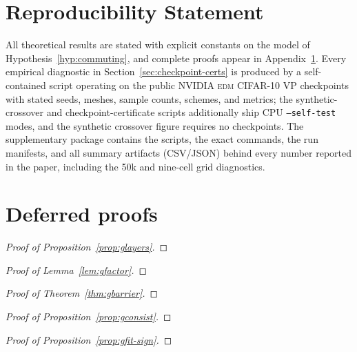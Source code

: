 \documentclass{article} %
\theoremstyle{plain}
\theoremstyle{definition}
\theoremstyle{remark}
\newif\ifarxiv
\begin{document}
\section*{Reproducibility Statement}
All theoretical results are stated with explicit constants on the model of
Hypothesis~\ref{hyp:commuting}, and complete proofs appear in
Appendix~\ref{app:proofs}.  Every empirical diagnostic in
Section~\ref{sec:checkpoint-certs} is produced by a self-contained script
operating on the public NVIDIA \textsc{edm} CIFAR-10 VP checkpoints with
stated seeds, meshes, sample counts, schemes, and metrics; the
synthetic-crossover and checkpoint-certificate scripts additionally ship CPU
\texttt{--self-test} modes, and the synthetic crossover figure requires no
checkpoints.  The supplementary package contains the scripts, the exact
commands, the run manifests, and all summary artifacts (CSV/JSON) behind every
number reported in the paper, including the 50k and nine-cell grid diagnostics.





\appendix

\section{Deferred proofs}
\label{app:proofs}

\begin{proof}[Proof of Proposition~\ref{prop:glayers}]
\ProofGLayers
\end{proof}

\begin{proof}[Proof of Lemma~\ref{lem:gfactor}]
\ProofGFactor
\end{proof}

\begin{proof}[Proof of Theorem~\ref{thm:gbarrier}]
\ProofGBarrier
\end{proof}

\begin{proof}[Proof of Proposition~\ref{prop:gconsist}]
\ProofGConsist
\end{proof}

\begin{proof}[Proof of Proposition~\ref{prop:gfit-sign}]
\ProofGFitSign
\end{proof}
\end{document}
